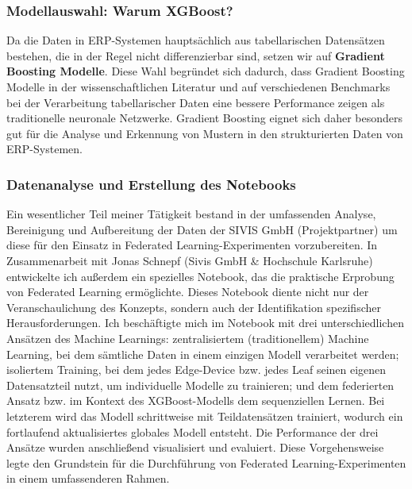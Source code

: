 \documentclass[11pt]{article}
\begin{document}
\subsubsection{Modellauswahl: Warum XGBoost?}
Da die Daten in ERP-Systemen hauptsächlich aus tabellarischen Datensätzen bestehen, die in der Regel nicht differenzierbar sind, setzen wir auf \textbf{Gradient Boosting Modelle}. Diese Wahl begründet sich dadurch, dass Gradient Boosting Modelle in der wissenschaftlichen Literatur und auf verschiedenen Benchmarks bei der Verarbeitung tabellarischer Daten eine bessere Performance zeigen als traditionelle neuronale Netzwerke. Gradient Boosting eignet sich daher besonders gut für die Analyse und Erkennung von Mustern in den strukturierten Daten von ERP-Systemen.

\subsubsection{Datenanalyse und Erstellung des Notebooks}
Ein wesentlicher Teil meiner Tätigkeit bestand in der umfassenden Analyse, Bereinigung und Aufbereitung der Daten der SIVIS GmbH (Projektpartner) um diese für den Einsatz in Federated Learning-Experimenten vorzubereiten. In Zusammenarbeit mit Jonas Schnepf (Sivis GmbH \& Hochschule Karlsruhe) entwickelte ich außerdem ein spezielles Notebook, das die praktische Erprobung von Federated Learning ermöglichte. Dieses Notebook diente nicht nur der Veranschaulichung des Konzepts, sondern auch der Identifikation  spezifischer Herausforderungen.
\newline
Ich beschäftigte mich im Notebook mit drei unterschiedlichen Ansätzen des Machine Learnings: zentralisiertem (traditionellem) Machine Learning, bei dem sämtliche Daten in einem einzigen Modell verarbeitet werden; isoliertem Training, bei dem jedes Edge-Device bzw. jedes Leaf seinen eigenen Datensatzteil nutzt, um individuelle Modelle zu trainieren; und dem federierten Ansatz bzw. im Kontext des XGBoost-Modells dem sequenziellen Lernen. Bei letzterem wird das Modell schrittweise mit Teildatensätzen trainiert, wodurch ein fortlaufend aktualisiertes globales Modell entsteht.
Die Performance der drei Ansätze wurden anschließend visualisiert und evaluiert. Diese Vorgehensweise legte den Grundstein für die Durchführung von Federated Learning-Experimenten in einem umfassenderen Rahmen.
\end{document}
